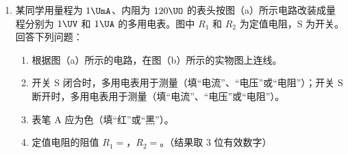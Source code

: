 \documentclass[\gkver]{gaokaozhenti}
\begin{document}
\begin{enumerate}
\begin{enumerate}
	{小球抛出点到落地点的水平距离 $s$}
	{桌面到地面的高度}
	{弹簧的压缩量 $\Delta x$}
	{弹簧原长 $l_{0}$}

	\item
	用所选取的测量量和已知量表示 $E_{k}$，得 $E_{k}=$。

	\item
	图（b）中的直线是实验测量得到的 $s-\Delta x$ 图线。从理论上可推出，如果 $h$ 不变，$m$ 增加，$s-\Delta x$ 图线的斜率会（填“增大”、“减小”或“不变”）；如果 $m$ 不变，$h$ 增加，$s-\Delta x$ 图线的斜率会（填“增大”、“减小”或“不变”）。由图（b）中给出的直线关系和 $E_{k}$ 的表达式可知，$E_{p}$ 与 $\Delta x$ 的次方成正比。
\end{enumerate}

{figs/22b.png}


\item
某同学用量程为 $1\UmA$、内阻为 $120\UO$ 的表头按图（a）所示电路改装成量程分别为 $1\UV$ 和 $1\UA$ 的多用电表。图中 $R_{1}$ 和 $R_{2}$ 为定值电阻，S 为开关。回答下列问题：
\begin{enumerate}
	\item
	根据图（a）所示的电路，在图（b）所示的实物图上连线。
	\item
	开关 S 闭合时，多用电表用于测量（填“电流”、“电压”或“电阻”）；开关 S 断开时，多用电表用于测量（填“电流”、“电压”或“电阻”）。
	\item
	表笔 A 应为色（填“红”或“黑”）。
	\item
	定值电阻的阻值 $R_{1}=$\tkanswer[1.8cm]{$1.00\UO$}，$R_{2}=$\tkanswer[1.8cm]{$880\UO$}。（结果取 3 位有效数字）
\end{enumerate}


\end{enumerate}
\end{document}
